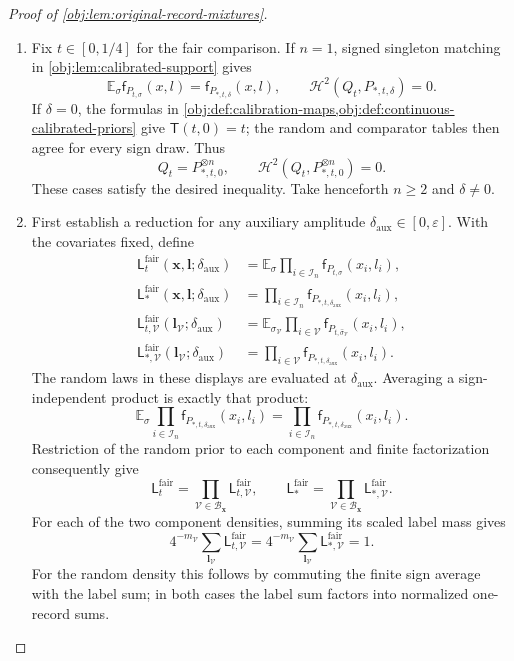 \documentclass[11pt]{article}
\begin{document}
\begin{proof}[Proof of \cref{obj:lem:original-record-mixtures}]
\begin{enumerate}
\item Fix \(t\in[0,1/4]\) for the fair comparison. If \(n=1\), signed
singleton matching in \cref{obj:lem:calibrated-support} gives
\[
\mathbb E_\sigma\mathsf f_{P_{t,\sigma}}(x,l)
=\mathsf f_{P_{*,t,\delta}}(x,l),
\qquad
\mathcal H^2(Q_t,P_{*,t,\delta})=0.
\]
If \(\delta=0\), the formulas in
\cref{obj:def:calibration-maps,obj:def:continuous-calibrated-priors}
give \(\mathsf T(t,0)=t\); the random and comparator tables then agree
for every sign draw. Thus
\[
Q_t=P_{*,t,0}^{\otimes n},
\qquad
\mathcal H^2(Q_t,P_{*,t,0}^{\otimes n})=0.
\]
These cases satisfy the desired inequality. Take henceforth \(n\ge2\)
and \(\delta\ne0\).

\item First establish a reduction for any auxiliary amplitude
\(\delta_{\mathrm{aux}}\in[0,\varepsilon]\). With the covariates fixed,
define
\[
\begin{aligned}
\mathsf L_t^{\mathrm{fair}}(\mathbf x,\boldsymbol l;\delta_{\mathrm{aux}})
&=\mathbb E_\sigma\prod_{i\in\mathcal I_n}
\mathsf f_{P_{t,\sigma}}(x_i,l_i),\\
\mathsf L_*^{\mathrm{fair}}(\mathbf x,\boldsymbol l;\delta_{\mathrm{aux}})
&=\prod_{i\in\mathcal I_n}
\mathsf f_{P_{*,t,\delta_{\mathrm{aux}}}}(x_i,l_i),\\
\mathsf L_{t,\mathcal V}^{\mathrm{fair}}
(\boldsymbol l_{\mathcal V};\delta_{\mathrm{aux}})
&=\mathbb E_{\sigma_{\mathcal V}}\prod_{i\in\mathcal V}
\mathsf f_{P_{t,\widehat\sigma_{\mathcal V}}}(x_i,l_i),\\
\mathsf L_{*,\mathcal V}^{\mathrm{fair}}
(\boldsymbol l_{\mathcal V};\delta_{\mathrm{aux}})
&=\prod_{i\in\mathcal V}
\mathsf f_{P_{*,t,\delta_{\mathrm{aux}}}}(x_i,l_i).
\end{aligned}
\]
The random laws in these displays are evaluated at
\(\delta_{\mathrm{aux}}\). Averaging a sign-independent product is
exactly that product:
\[
\mathbb E_\sigma
\prod_{i\in\mathcal I_n}
\mathsf f_{P_{*,t,\delta_{\mathrm{aux}}}}(x_i,l_i)
=
\prod_{i\in\mathcal I_n}
\mathsf f_{P_{*,t,\delta_{\mathrm{aux}}}}(x_i,l_i).
\]
Restriction of the random prior to each component and finite
factorization consequently give
\[
\mathsf L_t^{\mathrm{fair}}
=\prod_{\mathcal V\in\mathscr B_{\mathbf x}}
\mathsf L_{t,\mathcal V}^{\mathrm{fair}},
\qquad
\mathsf L_*^{\mathrm{fair}}
=\prod_{\mathcal V\in\mathscr B_{\mathbf x}}
\mathsf L_{*,\mathcal V}^{\mathrm{fair}}.
\]
For each of the two component densities, summing its scaled label
mass gives
\[
4^{-m_{\mathcal V}}
\sum_{\boldsymbol l_{\mathcal V}}
\mathsf L_{t,\mathcal V}^{\mathrm{fair}}
=
4^{-m_{\mathcal V}}
\sum_{\boldsymbol l_{\mathcal V}}
\mathsf L_{*,\mathcal V}^{\mathrm{fair}}
=1.
\]
For the random density this follows by commuting the finite sign
average with the label sum; in both cases the label sum factors into
normalized one-record sums.


\end{enumerate}
\end{proof}
\end{document}

